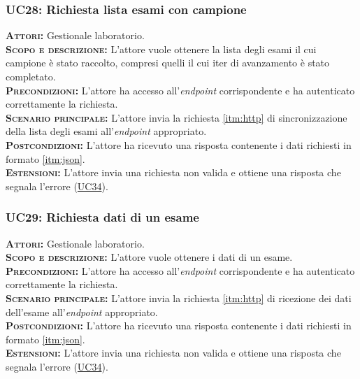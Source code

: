 \subsubsection{UC28: Richiesta lista esami con campione}
\label{sec:UC28}
\textsc{\textbf{Attori:}} Gestionale laboratorio.\\
\textsc{\textbf{Scopo e descrizione:}} L'attore vuole ottenere la lista degli esami il cui campione è stato raccolto, compresi quelli il cui iter di avanzamento è stato completato.\\
\textsc{\textsc{\textbf{Precondizioni:}}} L'attore ha accesso all'\textit{endpoint} corrispondente e ha autenticato correttamente la richiesta.\\
\textsc{\textbf{Scenario principale:}}  L'attore invia la richiesta \ref{itm:http} di sincronizzazione della lista degli esami all'\textit{endpoint} appropriato.\\
\textsc{\textbf{Postcondizioni:}} L'attore ha ricevuto una risposta contenente i dati richiesti in formato \ref{itm:json}.\\
\textsc{\textbf{Estensioni:}} L'attore invia una richiesta non valida e ottiene una risposta che segnala l'errore (\hyperref[sec:UC34]{UC34}).

\subsubsection{UC29: Richiesta dati di un esame}
\label{sec:UC29}
\textsc{\textbf{Attori:}} Gestionale laboratorio.\\
\textsc{\textbf{Scopo e descrizione:}} L'attore vuole ottenere i dati di un esame.\\
\textsc{\textsc{\textbf{Precondizioni:}}} L'attore ha accesso all'\textit{endpoint} corrispondente e ha autenticato correttamente la richiesta.\\
\textsc{\textbf{Scenario principale:}}  L'attore invia la richiesta \ref{itm:http} di ricezione dei dati dell'esame all'\textit{endpoint} appropriato.\\
\textsc{\textbf{Postcondizioni:}} L'attore ha ricevuto una risposta contenente i dati richiesti in formato \ref{itm:json}.\\
\textsc{\textbf{Estensioni:}} L'attore invia una richiesta non valida e ottiene una risposta che segnala l'errore (\hyperref[sec:UC34]{UC34}).

